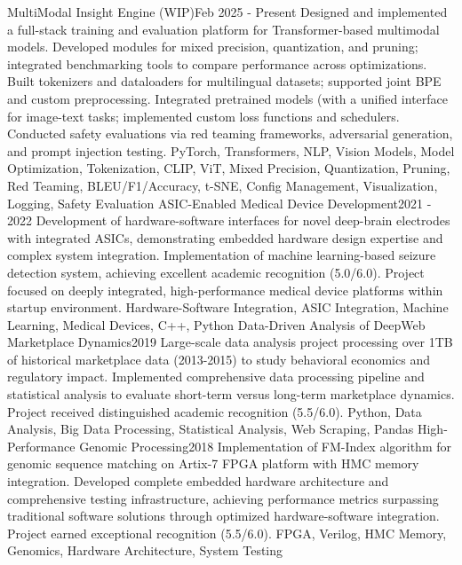 %
%
%


\begin{projects}

\project
{MultiModal Insight Engine (WIP)}{Feb 2025 - Present}
{}
{Designed and implemented a full-stack training and evaluation platform for Transformer-based multimodal models.
Developed modules for mixed precision, quantization, and pruning; integrated benchmarking tools to compare performance across optimizations.
Built tokenizers and dataloaders for multilingual datasets; supported joint BPE and custom preprocessing.
Integrated pretrained models (with a unified interface for image-text tasks; implemented custom loss functions and schedulers.
Conducted safety evaluations via red teaming frameworks, adversarial generation, and prompt injection testing.}
{PyTorch, Transformers, NLP, Vision Models, Model Optimization, Tokenization, CLIP, ViT, Mixed Precision, Quantization, Pruning, Red Teaming, BLEU/F1/Accuracy, t-SNE, Config Management, Visualization, Logging, Safety Evaluation}
\newpage
\project
{ASIC-Enabled Medical Device Development}{2021 - 2022}
{}
{Development of hardware-software interfaces for novel deep-brain electrodes with integrated ASICs, demonstrating embedded hardware design expertise and complex system integration. Implementation of machine learning-based seizure detection system, achieving excellent academic recognition (5.0/6.0). Project focused on deeply integrated, high-performance medical device platforms within startup environment.}
{Hardware-Software Integration, ASIC Integration, Machine Learning, Medical Devices, C++, Python}
\project
{Data-Driven Analysis of DeepWeb Marketplace Dynamics}{2019}
{}
{Large-scale data analysis project processing over 1TB of historical marketplace data (2013-2015) to study behavioral economics and regulatory impact. Implemented comprehensive data processing pipeline and statistical analysis to evaluate short-term versus long-term marketplace dynamics. Project received distinguished academic recognition (5.5/6.0).}
{Python, Data Analysis, Big Data Processing, Statistical Analysis, Web Scraping, Pandas}
\newpage
\project
{High-Performance Genomic Processing}{2018}
{}
{Implementation of FM-Index algorithm for genomic sequence matching on Artix-7 FPGA platform with HMC memory integration. Developed complete embedded hardware architecture and comprehensive testing infrastructure, achieving performance metrics surpassing traditional software solutions through optimized hardware-software integration. Project earned exceptional recognition (5.5/6.0).}
{FPGA, Verilog, HMC Memory, Genomics, Hardware Architecture, System Testing}

\end{projects}